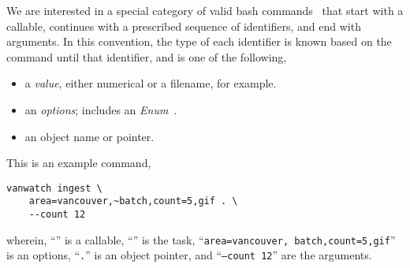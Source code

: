We are interested in a special category of valid bash commands~\cite{shell_syntax} that start with a callable, continues with a prescribed sequence of identifiers, and end with arguments. In this convention, the type of each identifier is known based on the command until that identifier, and is one of the following,
%
\begin{itemize}
    \item a \emph{value}, either numerical or a filename, for example.
    \item an \emph{options}; includes an \emph{Enum}~\cite{python_eunum}.
    \item an object name or pointer.
\end{itemize}
%
This is an example command,
%
\begin{verbatim}
vanwatch ingest \
    area=vancouver,~batch,count=5,gif . \
    --count 12
\end{verbatim}
%
wherein, ``'' is a callable, ``'' is the task, ``\texttt{area=vancouver,~batch,count=5,gif}'' is an options, ``\texttt{.}'' is an object pointer, and ``\texttt{--count 12}'' are the arguments.